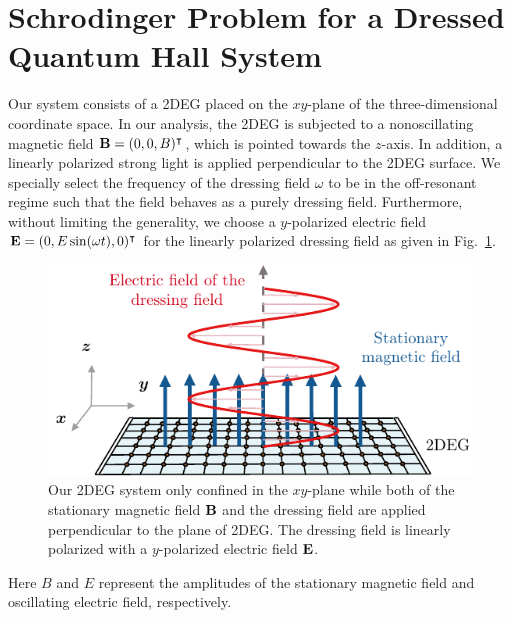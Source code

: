 \documentclass[
 reprint,
 amsmath,amssymb,
 aps,
 prb,
]{revtex4-2}
\begin{document}
\section{\label{sec:schrodinger_problem} Schrodinger Problem for a Dressed Quantum Hall System}

Our system consists of a 2DEG placed on the $xy$-plane of the three-dimensional coordinate space. In our analysis, the 2DEG is subjected to a nonoscillating magnetic field $\vb{B} = (0,0,B)^{\intercal}$, which is pointed towards the $z$-axis. In addition, a linearly polarized strong light is applied perpendicular to the 2DEG surface. We specially select the frequency of the dressing field $\omega$ to be in the off-resonant regime such that the field behaves as a purely dressing field. Furthermore, without limiting the generality, we choose a $y$-polarized electric field $\vb{E} = (0,E\sin(\omega t),0)^{\intercal}$ for the linearly polarized dressing field as given in Fig.~\ref{fig:1}.
\begin{figure}[b]
\includegraphics[scale=0.9]{fig_1_system_diagram}
\caption{\label{fig:1} Our 2DEG system only confined in the $xy$-plane while both of the stationary magnetic field $\vb{B}$ and the dressing field are applied perpendicular to the plane of 2DEG. The dressing field is linearly polarized with a $y$-polarized electric field $\vb{E}$.}
\end{figure}
Here $B$ and $E$ represent the amplitudes of the stationary magnetic field and oscillating electric field, respectively.
\end{document}
